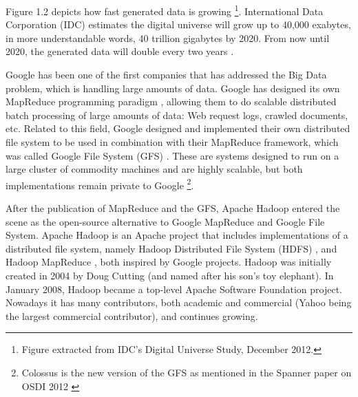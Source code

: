 Figure 1.2 depicts how fast generated data is growing  \footnote{Figure extracted from IDC's Digital Universe Study, December 2012.}. International Data Corporation (IDC) estimates the digital universe will grow up to 40,000 exabytes, in more understandable words, 40 trillion gigabytes by 2020. From now until 2020, the generated data will double every two years \cite{gantz2012digital}.
\par
Google has been one of the first companies that has addressed the Big Data problem, which is handling large amounts of data. Google has designed its own MapReduce programming paradigm \cite{dean2008mapreduce}, allowing them to do scalable distributed batch processing of large amounts of data: Web request logs, crawled documents, etc. Related to this field, Google designed and implemented their own distributed file system to be used in combination with their MapReduce framework, which was called Google File System (GFS) \cite{ghemawat2003google}. These are systems designed to run on a large cluster of commodity machines and are highly scalable, but both implementations remain private to Google \footnote{Colossus is the new version of the GFS as mentioned in the Spanner paper on OSDI 2012 \cite{corbett2012spanner}}.
\par
After the publication of MapReduce and the GFS, Apache Hadoop \cite{ApacheHadoop} entered the scene as the open-source alternative to Google MapReduce and Google File System. Apache Hadoop is an Apache project that includes implementations of a distributed file system, namely Hadoop Distributed File System (HDFS)  \cite{white2012hadoop, shvachko2010hadoop}, and Hadoop MapReduce \cite{ApacheHadoop}, both inspired by Google projects. Hadoop was initially created in 2004 by Doug Cutting (and named after his son's toy elephant). In January 2008, Hadoop became a top-level Apache Software Foundation project. Nowadays it has many contributors, both academic and commercial (Yahoo being the largest commercial contributor), and continues growing.
\par
